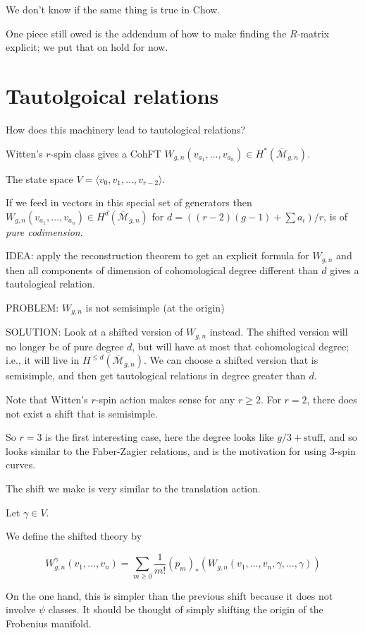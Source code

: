 \documentclass{amsart}
\theoremstyle{definition}
\newcommand{\Mbar}{\overline{\mathcal{M}}}
\begin{document}
We don't know if the same thing is true in Chow.

One piece still owed is the addendum of how to make finding the $R$-matrix explicit; we put that on hold for now.

\section{Tautolgoical relations}

How does this machinery lead to tautological relations?

Witten's $r$-spin class gives a CohFT $W_{g,n}(v_{a_1},\dots, v_{a_n})\in H^*(\Mbar_{g,n})$.

The state space $V=\langle v_0,v_1,\dots, v_{r-2}\rangle$.
 
If we feed in vectors in this special set of generators then $W_{g,n}(v_{a_1},\dots, v_{a_n})\in H^d(\Mbar_{g,n})$ for $d=((r-2)(g-1)+\sum a_i)/r$, is of \emph{pure codimension}.

IDEA: apply the reconstruction theorem to get an explicit formula for $W_{g,n}$ and then all components of dimension of cohomological degree different than $d$ gives a tautological relation.

PROBLEM: $W_{g,n}$ is not semisimple (at the origin)

SOLUTION: Look at a shifted version of $W_{g,n}$ instead.  The shifted version will no longer be of pure degree $d$, but will have at most that cohomological degree; i.e., it will live in $H^{\leq d}(\Mbar_{g,n})$.  We can choose a shifted version that is semisimple, and then get tautological relations in degree greater than $d$.

Note that Witten's $r$-spin action makes sense for any $r\geq 2$.  For $r=2$, there does not exist a shift that is semisimple.

So $r=3$ is the first interesting case, here the degree looks like $g/3+\text{stuff}$, and so looks similar to the Faber-Zagier relations, and is the motivation for using $3$-spin curves.

The shift we make is very similar to the translation action.

Let $\gamma\in V$.

We define the shifted theory by

$$W^\gamma_{g,n}(v_1,\dots, v_n)=\sum_{m\geq 0}\frac{1}{m!}(p_m)_*\left(W_{g,n}(v_1,\dots, v_n,\gamma,\dots, \gamma)\right)$$

On the one hand, this is simpler than the previous shift because it does not involve $\psi$ classes.  It should be thought of simply shifting the origin of the Frobenius manifold.
\end{document}
